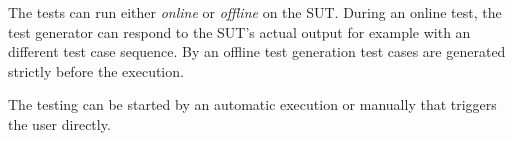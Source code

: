 The tests can run either \textit{online} or \textit{offline} on the SUT. During an online test, the test generator can respond to the SUT's actual output for example with an different test case sequence. By an offline test generation test cases are generated strictly before the execution.
	
The testing can be started by an automatic execution or manually that triggers the user directly.


